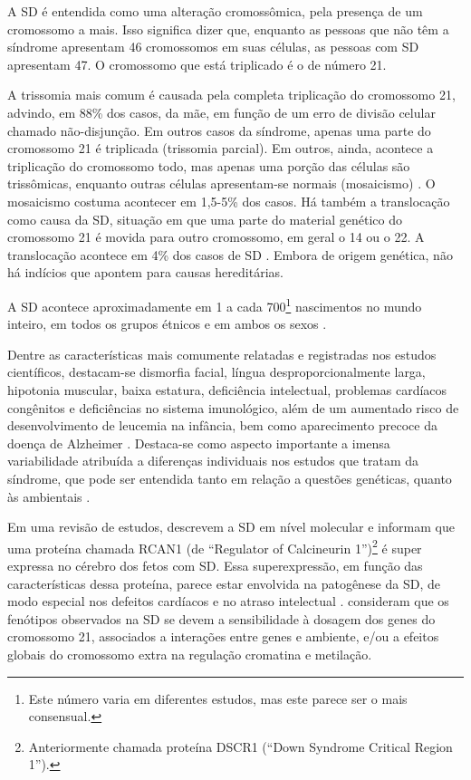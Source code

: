 \documentclass[output=paper,colorlinks,citecolor=brown,booklanguage=portuguese]{langscibook}
\begin{document}
A SD é entendida como uma alteração cromossômica, pela presença de um cromossomo a mais. Isso significa dizer que, enquanto as pessoas que não têm a síndrome apresentam 46 cromossomos em suas células, as pessoas com SD apresentam 47. O cromossomo que está triplicado é o de número 21.

A trissomia mais comum é causada pela completa triplicação do cromossomo 21, advindo, em 88\% dos casos, da mãe, em função de um erro de divisão celular chamado não-disjunção. Em outros casos da síndrome, apenas uma parte do cromossomo 21 é triplicada (trissomia parcial). Em outros, ainda, acontece a triplicação do cromossomo todo, mas apenas uma porção das células são trissômicas, enquanto outras células apresentam-se normais (mosaicismo) \citep{Schwartzman1999, KarmiloffSmith2016}. O mosaicismo costuma acontecer em 1,5-5\% dos casos. Há também a translocação como causa da SD, situação em que uma parte do material genético do cromossomo 21 é movida para outro cromossomo, em geral o 14 ou o 22. A translocação acontece em 4\% dos casos de SD \citep{KarmiloffSmith2016}. Embora de origem genética, não há indícios que apontem para causas hereditárias.

A SD acontece aproximadamente em 1 a cada 700\footnote{Este número varia em diferentes estudos, mas este parece ser o mais consensual.} nascimentos no mundo inteiro, em todos os grupos étnicos e em ambos os sexos \citep{Sommer2008, Herault2017}.

Dentre as características mais comumente relatadas e registradas nos estudos científicos, destacam-se dismorfia facial, língua desproporcionalmente larga, hipotonia muscular, baixa estatura, deficiência intelectual, problemas cardíacos congênitos e deficiências no sistema imunológico, além de um aumentado risco de desenvolvimento de leucemia na infância, bem como aparecimento precoce da doença de Alzheimer \citep{Sommer2008, KarmiloffSmith2016, Herault2017}. Destaca-se como aspecto importante a imensa variabilidade atribuída a diferenças individuais nos estudos que tratam da síndrome, que pode ser entendida tanto em relação a questões genéticas, quanto às ambientais \citep{Lanfranchi2019, KarmiloffSmith2016, Lorandi2019}.

Em uma revisão de estudos, \citet{Sommer2008} descrevem a SD em nível molecular e informam que uma proteína chamada RCAN1 (de “Regulator of Calcineurin 1”)\footnote{Anteriormente chamada proteína DSCR1 (“Down Syndrome Critical Region 1”).} é super expressa no cérebro dos fetos com SD. Essa superexpressão, em função das características dessa proteína, parece estar envolvida na patogênese da SD, de modo especial nos defeitos cardíacos e no atraso intelectual \citep{Fuentes1995}. \citet{Herault2017} consideram que os fenótipos observados na SD se devem a sensibilidade à dosagem dos genes do cromossomo 21, associados a interações entre genes e ambiente, e/ou a efeitos globais do cromossomo extra na regulação cromatina e metilação.
\end{document}
